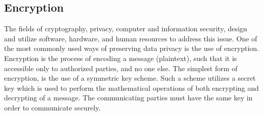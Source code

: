 \subsection{Encryption}
The fields of cryptography, privacy, computer and information security, design and utilize software, hardware, and human resources to address this issue.
One of the most commonly used ways of preserving data privacy is the use of encryption. Encryption is the process of encoding a message (plaintext), such that it is accessible only to authorized parties, and no one else.
The simplest form of encryption, is the use of a symmetric key scheme. Such a scheme utilizes a secret key which is used to perform the mathematical operations of both encrypting and decrypting of a message.
The communicating parties must have the same key in order to communicate securely.
